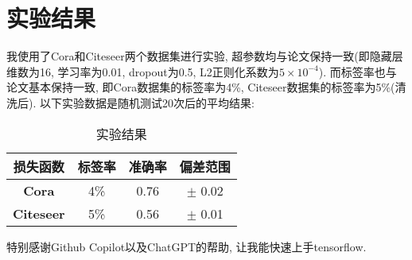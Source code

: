 \documentclass{article}
\begin{document}
\section{实验结果}
我使用了Cora和Citeseer两个数据集进行实验, 超参数均与论文保持一致(即隐藏层维数为16, 学习率为0.01, dropout为0.5, L2正则化系数为$5\times 10^{-4}$).
而标签率也与论文基本保持一致, 即Cora数据集的标签率为4\%, Citeseer数据集的标签率为5\%(清洗后).
以下实验数据是随机测试20次后的平均结果:
\begin{table}[htbp]
    \centering
    \caption{实验结果}
    \begin{tabular}{|c|c|c|c|}
        \hline
        \textbf{损失函数} & \textbf{标签率} & \textbf{准确率} & \textbf{偏差范围} \\
        \hline
        \textbf{Cora} & 4\% & 0.76 & $\pm$ 0.02 \\
        \textbf{Citeseer} & 5\% & 0.56 & $\pm$ 0.01 \\
        \hline
    \end{tabular}
\end{table}

特别感谢Github Copilot以及ChatGPT的帮助, 让我能快速上手tensorflow.
\end{document}
